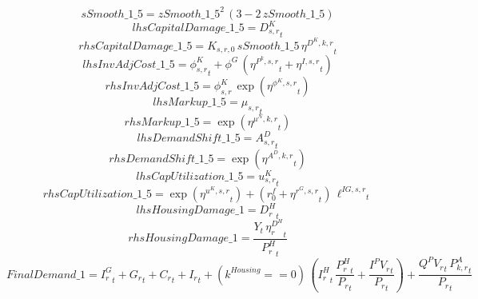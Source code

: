 \begin{dmath*}
sSmooth\_1\_5 = {zSmooth\_1\_5}^{2}\, \left(3-2\, {zSmooth\_1\_5}\right)
\end{dmath*}
\begin{dmath*}
lhsCapitalDamage\_1\_5 = {{D^K_{s,r}}}_{t}
\end{dmath*}
\begin{dmath*}
rhsCapitalDamage\_1\_5 = {{K_{s,r,0}}}\, {sSmooth\_1\_5}\, {{\eta^{D^{K},k,r}}}_{t}
\end{dmath*}
\begin{dmath*}
lhsInvAdjCost\_1\_5 = {{\phi^K_{s,r}}}_{t}+{{\phi^{G}}}\, \left({{\eta^{P^k,s,r}}}_{t}+{{\eta^{I,s,r}}}_{t}\right)
\end{dmath*}
\begin{dmath*}
rhsInvAdjCost\_1\_5 = {{\phi^{K}_{s,r}}}\, \exp\left({{\eta^{\phi^{K},{s,r}}}}_{t}\right)
\end{dmath*}
\begin{dmath*}
lhsMarkup\_1\_5 = {{\mu_{s,r}}}_{t}
\end{dmath*}
\begin{dmath*}
rhsMarkup\_1\_5 = \exp\left({{\eta^{\mu^{N},k,r}}}_{t}\right)
\end{dmath*}
\begin{dmath*}
lhsDemandShift\_1\_5 = {{A^{D}_{s,r}}}_{t}
\end{dmath*}
\begin{dmath*}
rhsDemandShift\_1\_5 = \exp\left({{\eta^{A^{D},k,r}}}_{t}\right)
\end{dmath*}
\begin{dmath*}
lhsCapUtilization\_1\_5 = {{u^K_{s,r}}}_{t}
\end{dmath*}
\begin{dmath*}
rhsCapUtilization\_1\_5 = \exp\left({{\eta^{u^K,s,r}}}_{t}\right)+\left({{r^f_0}}+{{\eta^{r^G,s,r}}}_{t}\right)\, {{\ell^{IG,s,r}}}_{t}
\end{dmath*}
\begin{dmath*}
lhsHousingDamage\_1 = {{D^H_r}}_{t}
\end{dmath*}
\begin{dmath*}
rhsHousingDamage\_1 = \frac{{Y}_{t}\, {{\eta^{D^{H}}_r}}_{t}}{{{P^H_r}}_{t}}
\end{dmath*}
\begin{dmath*}
FinalDemand\_1 = {{I^G_{r}}}_{t}+{{G_{r}}}_{t}+{{C_r}}_{t}+{{I_{r}}}_{t}+\left({{k^{Housing}}}==0\right)\, \left({{I^H_r}}_{t}\, \frac{{{P^H_r}}_{t}}{{{P_{r}}}_{t}}+\frac{{{I^PV_r}}_{t}}{{{P_{r}}}_{t}}\right)+\frac{{{Q^PV_r}}_{t}\, {{P^{A}_{k,r}}}_{t}}{{{P_{r}}}_{t}}
\end{dmath*}
